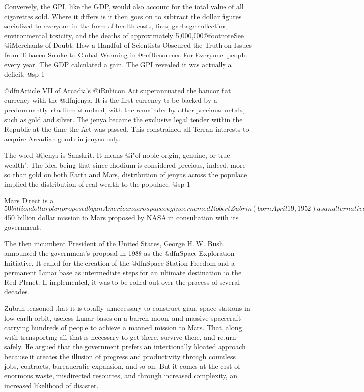 Conversely, the GPI, like the GDP, would also account for the total value of all cigarettes sold. Where it differs is it then goes on to subtract the dollar figures socialized to everyone in the form of health costs, fires, garbage collection, environmental toxicity, and the deaths of approximately 5,000,000@footnote{See @i{Merchants of Doubt: How a Handful of Scientists Obscured the Truth on Issues from Tobacco Smoke to Global Warming} in @ref{Resources For Everyone}.} people every year. The GDP calculated a gain. The GPI revealed it was actually a deficit.
@sp 1

@dfn{Article VII} of Arcadia's @i{Rubicon Act} superannuated the bancor fiat currency with the @dfn{jenya}. It is the first currency to be backed by a predominantly rhodium standard, with the remainder by other precious metals, such as gold and silver. The jenya became the exclusive legal tender within the Republic at the time the Act was passed. This constrained all Terran interests to acquire Arcadian goods in jenyas only.

The word @i{jenya} is Sanskrit. It means @i{"of noble origin, genuine, or true wealth"}. The idea being that since rhodium is considered precious, indeed, more so than gold on both Earth and Mars, distribution of jenyas across the populace implied the distribution of real wealth to the populace.
@sp 1

Mars Direct is a $50 billion dollar plan proposed by an American aerospace engineer named Robert Zubrin (born April 19, 1952) as an alternative to the prohibitively costly $450 billion dollar mission to Mars proposed by NASA in consultation with its government.

The then incumbent President of the United States, George H. W. Bush, announced the government's proposal in 1989 as the @dfn{Space Exploration Initiative}. It called for the creation of the @dfn{Space Station Freedom} and a permanent Lunar base as intermediate steps for an ultimate destination to the Red Planet. If implemented, it was to be rolled out over the process of several decades.

Zubrin reasoned that it is totally unnecessary to construct giant space stations in low earth orbit, useless Lunar bases on a barren moon, and massive spacecraft carrying hundreds of people to achieve a manned mission to Mars. That, along with transporting all that is necessary to get there, survive there, and return safely. He argued that the government prefers an intentionally bloated approach because it creates the illusion of progress and productivity through countless jobs, contracts, bureaucratic expansion, and so on. But it comes at the cost of enormous waste, misdirected resources, and through increased complexity, an increased likelihood of disaster.

